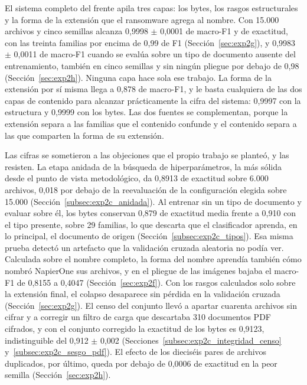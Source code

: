 El sistema completo del frente apila tres capas: los bytes, los rasgos estructurales y la forma de la extensión que el ransomware agrega al nombre. Con 15.000 archivos y cinco semillas alcanza 0,9998 $\pm$ 0,0001 de macro-F1 y de exactitud, con las treinta familias por encima de 0,99 de F1 (Sección~\ref{sec:exp2g}), y 0,9983 $\pm$ 0,0011 de macro-F1 cuando se evalúa sobre un tipo de documento ausente del entrenamiento, también en cinco semillas y sin ningún pliegue por debajo de 0,98 (Sección~\ref{sec:exp2h}). Ninguna capa hace sola ese trabajo. La forma de la extensión por sí misma llega a 0,878 de macro-F1, y le basta cualquiera de las dos capas de contenido para alcanzar prácticamente la cifra del sistema: 0,9997 con la estructura y 0,9999 con los bytes. Las dos fuentes se complementan, porque la extensión separa a las familias que el contenido confunde y el contenido separa a las que comparten la forma de su extensión.

Las cifras se sometieron a las objeciones que el propio trabajo se planteó, y las resisten. La etapa anidada de la búsqueda de hiperparámetros, la más sólida desde el punto de vista metodológico, da 0,8913 de exactitud sobre 6.000 archivos, 0,018 por debajo de la reevaluación de la configuración elegida sobre 15.000 (Sección~\ref{subsec:exp2c_anidada}). Al entrenar sin un tipo de documento y evaluar sobre él, los bytes conservan 0,879 de exactitud media frente a 0,910 con el tipo presente, sobre 29 familias, lo que descarta que el clasificador aprenda, en lo principal, el documento de origen (Sección~\ref{subsec:exp2c_tipos}). Esa misma prueba detectó un artefacto que la validación cruzada aleatoria no podía ver. Calculada sobre el nombre completo, la forma del nombre aprendía también cómo nombró NapierOne sus archivos, y en el pliegue de las imágenes bajaba el macro-F1 de 0,8155 a 0,4047 (Sección~\ref{sec:exp2f}). Con los rasgos calculados solo sobre la extensión final, el colapso desaparece sin pérdida en la validación cruzada (Sección~\ref{sec:exp2g}). El censo del conjunto llevó a apartar cuarenta archivos sin cifrar y a corregir un filtro de carga que descartaba 310 documentos PDF cifrados, y con el conjunto corregido la exactitud de los bytes es 0,9123, indistinguible del 0,912 $\pm$ 0,002 (Secciones~\ref{subsec:exp2c_integridad_censo} y~\ref{subsec:exp2c_sesgo_pdf}). El efecto de los dieciséis pares de archivos duplicados, por último, queda por debajo de 0,0006 de exactitud en la peor semilla (Sección~\ref{sec:exp2h}).

